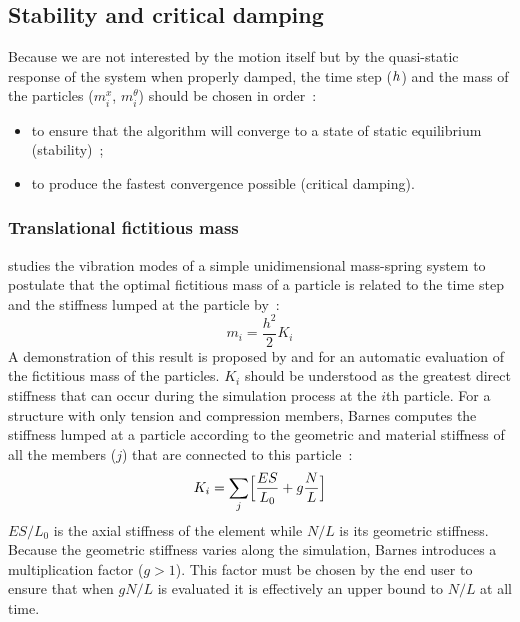
\subsection{Stability and critical damping}\label{sec:stab_crit}
Because we are not interested by the motion itself but by the quasi-static response of the system when properly damped, the time step ($h{}$) and the mass of the particles ($m_i^x$, $m_i^{\theta}$) should be chosen in order~:
\begin{itemize}
\item to ensure that the algorithm will converge to a state of static equilibrium (stability)~;
\item to produce the fastest convergence possible (critical damping).
\end{itemize}

\subsubsection{Translational fictitious mass}

 studies the vibration modes of a simple unidimensional mass-spring system to postulate that the optimal fictitious mass of a particle is related to the time step and the stiffness lumped at the particle by~:
\begin{equation}
	m_i = \frac{h^2}{2} K_i
\end{equation}
A demonstration of this result is proposed by  and  for an automatic evaluation of the fictitious mass of the particles. $K_i$ should be understood as the greatest direct stiffness that can occur during the simulation process at the $i$th particle. For a structure with only tension and compression members, Barnes computes the stiffness lumped at a particle according to the geometric and material stiffness of all the members ($j$) that are connected to this particle~:
\begin{equation}
	K_i = \sum_j \Bigl[\frac{ES}{L_0} + g \frac{N}{L} \Bigr]
\end{equation}
$ES/L_0$ is the axial stiffness of the element while $N/L$ is its geometric stiffness. Because the geometric stiffness varies along the simulation, Barnes introduces a multiplication factor ($g > 1$). This factor must be chosen by the end user to ensure that when $gN/L$ is evaluated it is effectively an upper bound to $N/L$ at all time.

